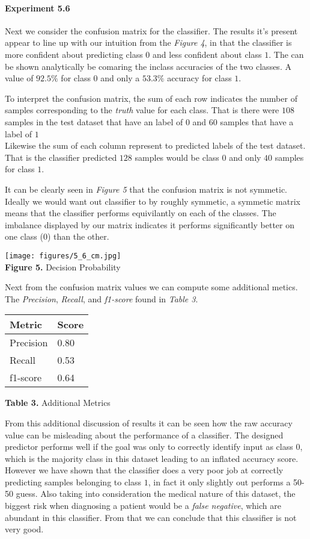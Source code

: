 \documentclass[11pt]{article}
\begin{document}
    \hypertarget{experiment-5.6}{%
\paragraph{Experiment 5.6}\label{experiment-5.6}}

Next we consider the confusion matrix for the classifier. The results
it's present appear to line up with our intuition from the \emph{Figure
4}, in that the classifier is more confident about predicting class
\(0\) and less confident about class \(1\). The can be shown
analytically be comaring the inclass accuracies of the two classes. A
value of \(92.5\%\) for class \(0\) and only a \(53.3\%\) accuracy for
class \(1\).

To interpret the confusion matrix, the sum of each row indicates the
number of samples corresponding to the \emph{truth} value for each
class. That is there were \(108\) samples in the test dataset that have
an label of \(0\) and \(60\) samples that have a label of \(1\)\\
Likewise the sum of each column represent to predicted labels of the
test dataset. That is the classifier predicted \(128\) samples would be
class \(0\) and only \(40\) samples for class \(1\).

It can be clearly seen in \emph{Figure 5} that the confusion matrix is
not symmetic. Ideally we would want out classifier to by roughly
symmetic, a symmetic matrix means that the classifier performs
equivilantly on each of the classes. The imbalance displayed by our
matrix indicates it performs significantly better on one class (\(0\))
than the other.

\texttt{[image: figures/5\_6\_cm.jpg]}\\
\textbf{Figure 5.} Decision Probability

Next from the confusion matrix values we can compute some additional
metics. The \emph{Precision}, \emph{Recall}, and \emph{f1-score} found
in \emph{Table 3}.

\begin{longtable}[]{@{}ll@{}}
\toprule
Metric & Score \\
\midrule
\endhead
Precision & 0.80 \\
Recall & 0.53 \\
f1-score & 0.64 \\
\bottomrule
\end{longtable}

\textbf{Table 3.} Additional Metrics

From this additional discussion of results it can be seen how the raw
accuracy value can be misleading about the performance of a classifier.
The designed predictor performs well if the goal was only to correctly
identify input as class \(0\), which is the majority class in this
dataset leading to an inflated accuracy score. However we have shown
that the classifier does a very poor job at correctly predicting samples
belonging to class \(1\), in fact it only slightly out performs a 50-50
guess. Also taking into consideration the medical nature of this
dataset, the biggest risk when diagnosing a patient would be a
\emph{false negative}, which are abundant in this classifier. From that
we can conclude that this classifier is not very good.
\end{document}
